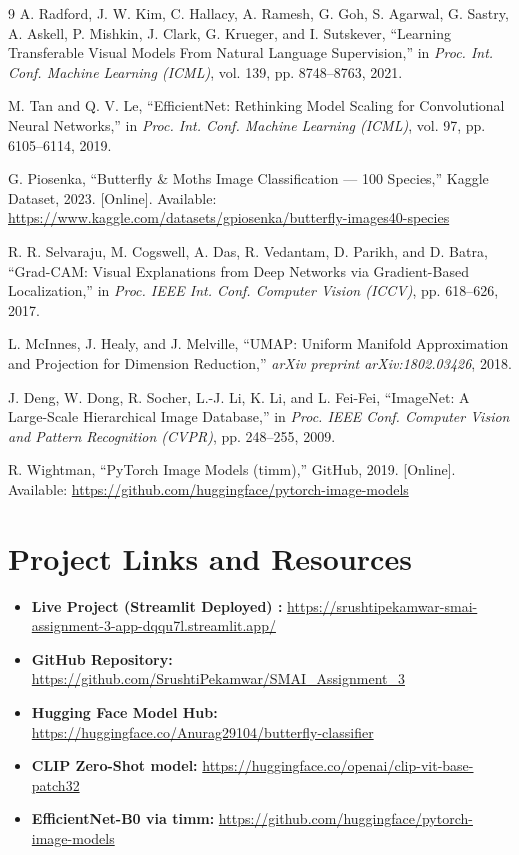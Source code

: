 \documentclass[journal, twocolumn]{IEEEtran}
\begin{document}
\begin{thebibliography}{9}
A. Radford, J. W. Kim, C. Hallacy, A. Ramesh, G. Goh, S. Agarwal, G. Sastry, A. Askell, P. Mishkin, J. Clark, G. Krueger, and I. Sutskever, ``Learning Transferable Visual Models From Natural Language Supervision,'' in \emph{Proc. Int. Conf. Machine Learning (ICML)}, vol. 139, pp. 8748--8763, 2021.

M. Tan and Q. V. Le, ``EfficientNet: Rethinking Model Scaling for Convolutional Neural Networks,'' in \emph{Proc. Int. Conf. Machine Learning (ICML)}, vol. 97, pp. 6105--6114, 2019.

G. Piosenka, ``Butterfly \& Moths Image Classification --- 100 Species,'' Kaggle Dataset, 2023. [Online]. Available: \url{https://www.kaggle.com/datasets/gpiosenka/butterfly-images40-species}

R. R. Selvaraju, M. Cogswell, A. Das, R. Vedantam, D. Parikh, and D. Batra, ``Grad-CAM: Visual Explanations from Deep Networks via Gradient-Based Localization,'' in \emph{Proc. IEEE Int. Conf. Computer Vision (ICCV)}, pp. 618--626, 2017.

L. McInnes, J. Healy, and J. Melville, ``UMAP: Uniform Manifold Approximation and Projection for Dimension Reduction,'' \emph{arXiv preprint arXiv:1802.03426}, 2018.

J. Deng, W. Dong, R. Socher, L.-J. Li, K. Li, and L. Fei-Fei, ``ImageNet: A Large-Scale Hierarchical Image Database,'' in \emph{Proc. IEEE Conf. Computer Vision and Pattern Recognition (CVPR)}, pp. 248--255, 2009.

R. Wightman, ``PyTorch Image Models (timm),'' GitHub, 2019. [Online]. Available: \url{https://github.com/huggingface/pytorch-image-models}
\end{thebibliography}

\appendix
\section{Project Links and Resources}

\begin{itemize}
    \item \textbf{Live Project (Streamlit Deployed) :} \url{https://srushtipekamwar-smai-assignment-3-app-dqqu7l.streamlit.app/}
    \item \textbf{GitHub Repository:} \url{https://github.com/SrushtiPekamwar/SMAI_Assignment_3}
    \item \textbf{Hugging Face Model Hub:} \url{https://huggingface.co/Anurag29104/butterfly-classifier}
    \item \textbf{CLIP Zero-Shot model:} \url{https://huggingface.co/openai/clip-vit-base-patch32}
    \item \textbf{EfficientNet-B0 via timm:} \url{https://github.com/huggingface/pytorch-image-models}
\end{itemize}
\end{document}
